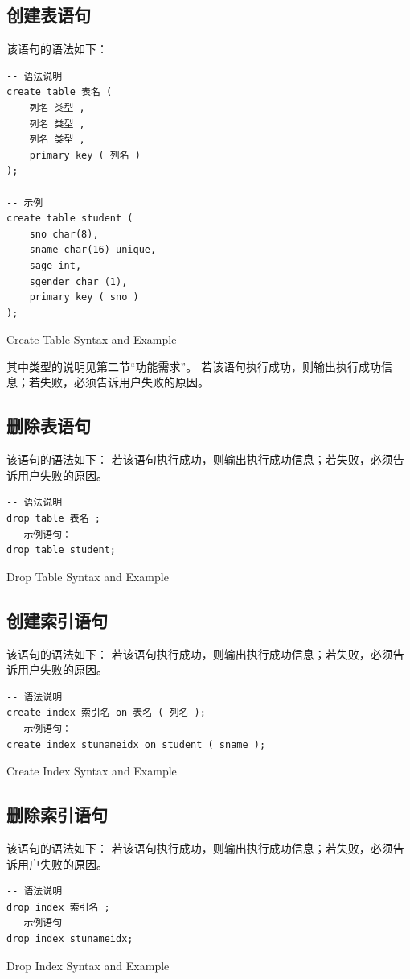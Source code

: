 \documentclass[UTF8]{ctexrep} %
\newenvironment{longlisting}{\captionsetup{type=listing}}{}
\begin{document}
\subsection{创建表语句}
该语句的语法如下：
\begin{longlisting}
    \begin{verbatim}
-- 语法说明
create table 表名 (
    列名 类型 ,
    列名 类型 ,
    列名 类型 ,
    primary key ( 列名 )
);

-- 示例
create table student (
    sno char(8),
    sname char(16) unique,
    sage int,
    sgender char (1),
    primary key ( sno )
);
    \end{verbatim}
    \caption{Create Table Syntax and Example}
    \label{lst:create_table_requirements}
\end{longlisting}
其中类型的说明见第二节“功能需求”。
若该语句执行成功，则输出执行成功信息；若失败，必须告诉用户失败的原因。

\subsection{删除表语句}
该语句的语法如下：
若该语句执行成功，则输出执行成功信息；若失败，必须告诉用户失败的原因。
\begin{longlisting}
    \begin{verbatim}
-- 语法说明
drop table 表名 ;
-- 示例语句：
drop table student;
    \end{verbatim}
    \caption{Drop Table Syntax and Example}
    \label{lst:drop_table_requirements}
\end{longlisting}

\subsection{创建索引语句}
该语句的语法如下：
若该语句执行成功，则输出执行成功信息；若失败，必须告诉用户失败的原因。
\begin{longlisting}
    \begin{verbatim}
-- 语法说明
create index 索引名 on 表名 ( 列名 );
-- 示例语句：
create index stunameidx on student ( sname );
    \end{verbatim}
    \caption{Create Index Syntax and Example}
    \label{lst:create_index_requirements}
\end{longlisting}

\subsection{删除索引语句}
该语句的语法如下：
若该语句执行成功，则输出执行成功信息；若失败，必须告诉用户失败的原因。
\begin{longlisting}
    \begin{verbatim}
-- 语法说明
drop index 索引名 ;
-- 示例语句
drop index stunameidx;
    \end{verbatim}
    \caption{Drop Index Syntax and Example}
    \label{lst:drop_index_requirements}
\end{longlisting}
\end{document}
